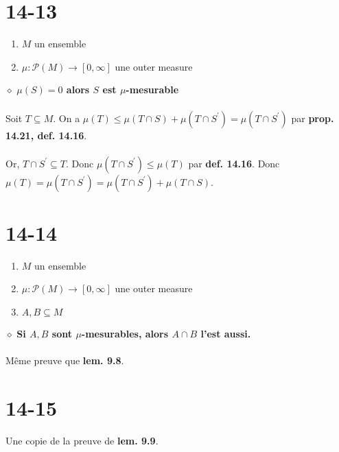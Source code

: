 \documentclass[a4paper,10pt]{article}
\begin{document}
\section*{14-13}
\begin{enumerate}
	\item $M$ un ensemble
	\item $\mu : \mathcal{P} (M) \rightarrow [0, \infty]$ une outer measure
\end{enumerate}
$\diamond$ \textbf{$\mu (S) = 0$ alors $S$ est $\mu$-mesurable}
\\
\\
Soit $T \subseteq M$. On a $\mu (T) \leq \mu(T \cap S ) + \mu (T \cap S^\prime) = \mu (T \cap S^\prime)$ par \textbf{prop. 14.21, def. 14.16}.
\\
\\
Or, $T \cap S^\prime \subseteq T$. Donc $\mu (T \cap S^\prime) \leq \mu (T)$ par \textbf{def. 14.16}. Donc $\mu(T) = \mu(T \cap S^\prime) = \mu (T \cap S^\prime) + \mu (T \cap S)$.

\section*{14-14}
\begin{enumerate}
	\item $M$ un ensemble
	\item $\mu : \mathcal{P} (M) \rightarrow [0, \infty]$ une outer measure 
	\item $A,B \subseteq M$
\end{enumerate}
$\diamond$ \textbf{Si $A,B$ sont $\mu$-mesurables, alors $A\cap B$ l'est aussi.}
\\
\\
Même preuve que \textbf{lem. 9.8}.

\section*{14-15}
Une copie de la preuve de \textbf{lem. 9.9}.
\end{document}
